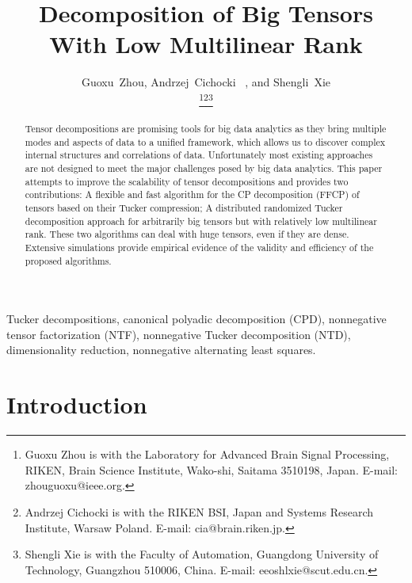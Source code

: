 \documentclass[10pt,twocolumn,twoside]{IEEEtran}
\begin{document}
\title{Decomposition of Big Tensors With Low Multilinear Rank}
{\author{Guoxu~Zhou, Andrzej~Cichocki ~, and Shengli~Xie 

\thanks{Guoxu Zhou is with the Laboratory for Advanced Brain Signal Processing, RIKEN, Brain Science Institute, Wako-shi, Saitama 3510198, Japan. E-mail: zhouguoxu@ieee.org.}\thanks{Andrzej Cichocki is with the RIKEN BSI, Japan and Systems Research Institute, Warsaw Poland. E-mail: cia@brain.riken.jp.}\thanks{Shengli Xie is with the Faculty of Automation, Guangdong University of Technology, Guangzhou 510006, China. E-mail: eeoshlxie@scut.edu.cn.}}
}




\maketitle


\begin{abstract}
Tensor decompositions are promising tools for big data analytics as they bring multiple modes and aspects of data to a unified framework, which allows us to discover complex internal structures and correlations of data. Unfortunately most existing approaches are not designed to meet the major challenges posed by big data analytics. This paper attempts to improve the scalability of tensor decompositions and provides two  contributions: A flexible and fast algorithm for the CP decomposition (FFCP) of tensors based on their Tucker compression; A distributed randomized Tucker decomposition approach for arbitrarily big tensors but with relatively low multilinear rank. These two algorithms can deal with huge tensors, even if they are dense. Extensive simulations provide empirical evidence of the validity and efficiency of the proposed algorithms.
 \end{abstract}

\begin{IEEEkeywords}
Tucker decompositions, canonical polyadic decomposition (CPD), nonnegative tensor factorization (NTF), nonnegative Tucker decomposition (NTD), dimensionality reduction, nonnegative alternating least squares.
\end{IEEEkeywords}


\IEEEpeerreviewmaketitle



\section{Introduction}
\label{sec:Intro}
\end{document}
